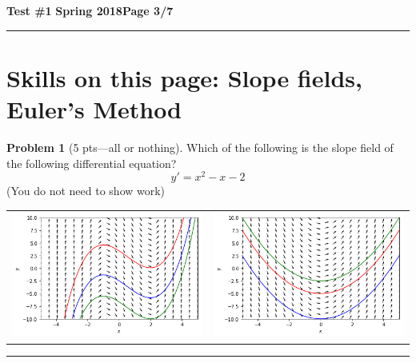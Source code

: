 \documentclass[12pt]{article}
\theoremstyle{definition}
\newtheorem{problem}{Problem}
\begin{document}
\hfill{\large\bf Test \#1}\hfill{\large\bf
Spring 2018}\hfill{\large\bf Page 3/7}\hrule

\section*{Skills on this page: Slope fields, Euler's Method}
\begin{problem}[5 pts---all or nothing]
Which of the following is the slope field of the following differential equation?
\begin{equation*}
y' = x^2 -x-2
\end{equation*}
\noindent (You do not need to show work)
\begin{center}
\begin{tabular}{cc}
\includegraphics[width=0.5\linewidth]{quiver1.png} &
\includegraphics[width=0.5\linewidth]{quiver2.png}
\end{tabular}
\end{center}
\end{problem}
\hrule
\end{document}

